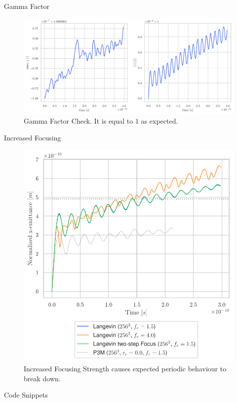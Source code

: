 \begin{frame}{Gamma Factor}
    \begin{figure}[!htb]
      \includegraphics[width=\linewidth]{figures/comparison_gamma.pdf}
        \caption{Gamma Factor Check. It is equal to $1$ as expected.}
      \label{fig:gamma_factor}
    \end{figure}
\end{frame}


\begin{frame}{Increased Focusing}
    \begin{figure}[!htb]
      \includegraphics[width=0.6\linewidth]{figures/comparison_focus.pdf}
        \caption{Increased Focusing Strength causes expected periodic behaviour to break down.}
      \label{fig:increased_focusing}
    \end{figure}
\end{frame}


\begin{frame}[fragile]{Code Snippets}
    \inputminted{c++}{./code_snippets/stencils.cpp}
    \inputminted{c++}{./code_snippets/operator.cpp}
\end{frame}


